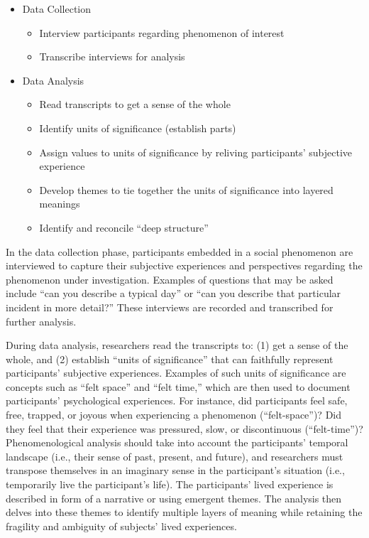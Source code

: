 \begin{itemize}
	\item Data Collection
	\begin{itemize}
		\item Interview participants regarding phenomenon of interest
		\item Transcribe interviews for analysis
	\end{itemize}
	\item Data Analysis
	\begin{itemize}
		\item Read transcripts to get a sense of the whole
		\item Identify units of significance (establish parts)
		\item Assign values to units of significance by reliving participants' subjective experience
		\item Develop themes to tie together the units of significance into layered meanings
		\item Identify and reconcile ``deep structure''
	\end{itemize}
\end{itemize}

In the data collection phase, participants embedded in a social phenomenon are interviewed to capture their subjective experiences and perspectives regarding the phenomenon under investigation. Examples of questions that may be asked include ``can you describe a typical day'' or ``can you describe that particular incident in more detail?'' These interviews are recorded and transcribed for further analysis. 

During data analysis, researchers read the transcripts to: (1) get a sense of the whole, and (2) establish ``units of significance'' that can faithfully represent participants' subjective experiences. Examples of such units of significance are concepts such as ``felt space'' and ``felt time,'' which are then used to document participants' psychological experiences. For instance, did participants feel safe, free, trapped, or joyous when experiencing a phenomenon (``felt-space'')? Did they feel that their experience was pressured, slow, or discontinuous (``felt-time'')? Phenomenological analysis should take into account the participants' temporal landscape (i.e., their sense of past, present, and future), and researchers must transpose themselves in an imaginary sense in the participant's situation (i.e., temporarily live the participant's life). The participants' lived experience is described in form of a narrative or using emergent themes. The analysis then delves into these themes to identify multiple layers of meaning while retaining the fragility and ambiguity of subjects' lived experiences.

